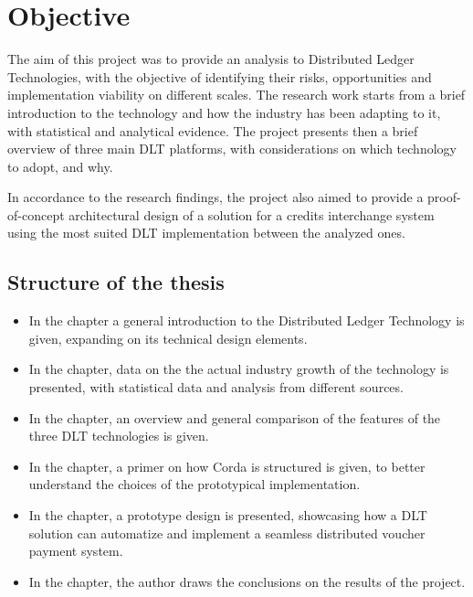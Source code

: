 
\newpage

\mbox{}\vfill
\chapter*{\centering Objective}

The aim of this project was to provide an analysis to Distributed Ledger Technologies, with the objective of identifying their risks, opportunities and implementation viability on different scales. The research work starts from a brief introduction to the technology and how the industry has been adapting to it, with statistical and analytical evidence. The project presents then a brief overview of three main DLT platforms, with considerations on which technology to adopt, and why.

In accordance to the research findings, the project also aimed to provide a proof-of-concept architectural design of a solution for a credits interchange system using the most suited DLT implementation between the analyzed ones.

\section*{Structure of the thesis}

\begin{itemize}

    \item In the  chapter a general introduction to the Distributed Ledger Technology is given, expanding on its technical design elements.

    \item In the  chapter, data on the the actual industry growth of the technology is presented, with statistical data and analysis from different sources.

    \item In the  chapter, an overview and general comparison of the features of the three DLT technologies is given.

    \item In the  chapter, a primer on how Corda is structured is given, to better understand the choices of the prototypical implementation.

    \item In the  chapter, a prototype design is presented, showcasing how a DLT solution can automatize and implement a seamless distributed voucher payment system.

    \item In the  chapter, the author draws the conclusions on the results of the project.


\end{itemize}

\mbox{}\vfill